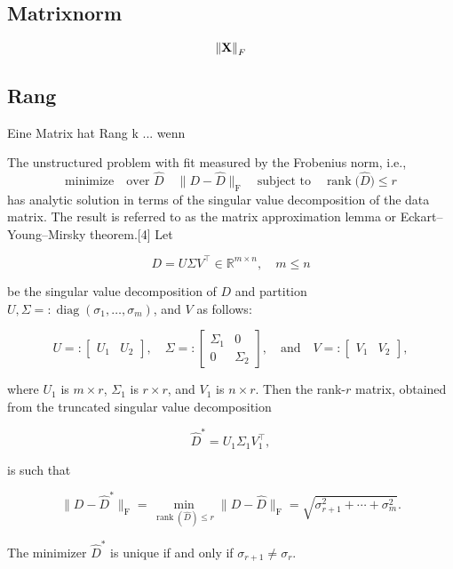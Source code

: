 \subsection{Matrixnorm}
\begin{defn}[Frobeniusnorm]
$$\left\lVert \mathbf{X} \right\rVert_F$$
\end{defn}

\subsection{Rang}

\begin{defn}[Rang]
Eine Matrix hat Rang k ... wenn
\end{defn}

\begin{thm}
The unstructured problem with fit measured by the Frobenius norm, i.e.,
$$\text{minimize} \quad \text{over } \widehat D \quad \|D - \widehat D\|_{\text{F}} \quad\text{subject to}\quad \operatorname{rank}\big(\widehat D\big) \leq r $$
has analytic solution in terms of the singular value decomposition of the data matrix. The result is referred to as the matrix approximation lemma or Eckart–Young–Mirsky theorem.[4] Let

$$D = U\Sigma V^{\top} \in \mathbb{R}^{m\times n}, \quad m \leq n$$

be the singular value decomposition of $D$ and partition $U, \Sigma=:\operatorname{diag}(\sigma_1,\ldots,\sigma_m)$, and $V$ as follows:

$$U =: \begin{bmatrix} U_1 & U_2\end{bmatrix}, \quad 
\Sigma =: \begin{bmatrix} \Sigma_1 & 0 \\ 0 & \Sigma_2 \end{bmatrix}, \quad\text{and}\quad 
V =: \begin{bmatrix} V_1 & V_2 \end{bmatrix},$$

where $U_{1}$ is $m\times r$, $\Sigma _{1}$ is $r\times r$, and $V_{1}$ is $n\times r$. Then the rank-$r$ matrix, obtained from the truncated singular value decomposition

$$\widehat D^* = U_1 \Sigma_1 V_1^{\top},$$

is such that

$$\|D-\widehat D^*\|_{\text{F}} = \min_{\operatorname{rank}(\widehat D) \leq r} \|D-\widehat D\|_{\text{F}} = \sqrt{\sigma^2_{r+1} + \cdots + \sigma^2_m}.$$

The minimizer $\widehat D^*$ is unique if and only if $\sigma_{r+1}\neq\sigma_{r}$.
\end{thm}

